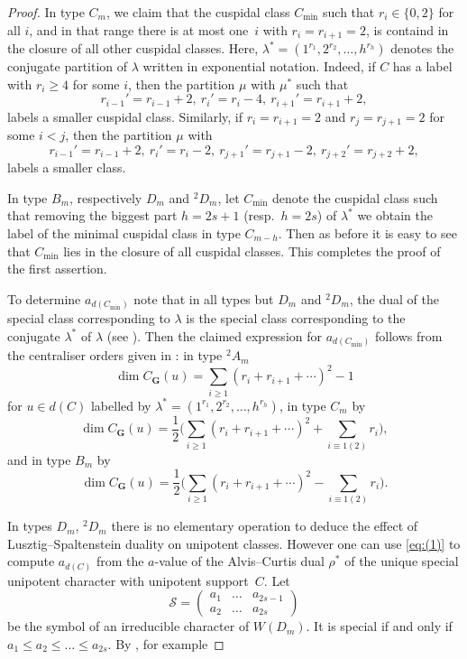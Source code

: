 \documentclass[12pt,leqno,a4paper]{amsart}
\newcommand{\bG}{{\mathbf{G}}}
\newcommand{\cS}{{\mathcal{S}}}
\newcommand{\mi}{{\operatorname{min}}}
\newcommand{\tw}[1]{{}^{#1}\!}
\let\la=\lambda
\theoremstyle{remark}
\begin{document}
\begin{proof}
In type $C_m$, we claim that the cuspidal class $C_\mi$ such that
$r_i\in\{0,2\}$ for all $i$, and in that range there is at most one~$i$ with
$r_i=r_{i+1}=2$, is containd in the closure of all other cuspidal classes.
Here, $\la^* = (1^{r_1},2^{r_2},\ldots,h^{r_h})$ denotes the conjugate
partition of $\la$ written in exponential notation. Indeed, if $C$ has a label
with $r_i\ge4$ for some $i$, then the partition $\mu$ with $\mu^*$ such that
$$r_{i-1}'=r_{i-1}+2,\ r_i'=r_i-4,\ r_{i+1}'=r_{i+1}+2,$$
labels a smaller cuspidal class. Similarly, if $r_i=r_{i+1}=2$ and
$r_j=r_{j+1}=2$ for some $i<j$, then the partition $\mu$ with
$$r_{i-1}'=r_{i-1}+2,\ r_i'=r_i-2,\ r_{j+1}'=r_{j+1}-2,\ r_{j+2}'=r_{j+2}+2,$$
labels a smaller class.
\par
In type $B_m$, respectively $D_m$ and $\tw2D_m$, let $C_\mi$ denote the
cuspidal class such that removing the biggest part $h=2s+1$ (resp.~$h=2s$) of
$\la^*$ we obtain the label of the minimal cuspidal class in type $C_{m-h}$.
Then as before it is easy to see that $C_\mi$ lies in the closure of all
cuspidal classes. This completes the proof of the first assertion.
\par
To determine $a_{d(C_\mi)}$ note that in all types but $D_m$ and $\tw2D_m$,
the dual of the special class corresponding to $\la$ is the special class
corresponding to the conjugate $\la^*$ of $\la$ (see
\cite[\S12.7 and \S13.4]{Ca}). Then the claimed expression for $a_{d(C_\mi)}$
follows from the centraliser orders given in \cite[\S 13.1]{Ca}: in type
$\tw2A_m$
$$\dim C_\bG(u)=\sum_{i\geq1}(r_i+r_{i+1}+\cdots)^2 - 1$$
for $u\in d(C)$ labelled by $\la^* = (1^{r_1},2^{r_2},\ldots,h^{r_h})$,
in type $C_m$ by
$$\dim C_\bG(u)=\frac{1}{2}\big(\sum_{i\geq1}(r_i+r_{i+1}+\cdots)^2
   +\sum_{i\equiv1(2)}r_i\big),$$
and in type $B_m$ by
$$\dim C_\bG(u)=\frac{1}{2}\big(\sum_{i\geq1}(r_i+r_{i+1}+\cdots)^2
   -\sum_{i\equiv1(2)}r_i\big).$$
\par
In types $D_m$, $\tw2D_m$ there is no elementary operation to deduce the
effect of Lusztig--Spaltenstein
duality on unipotent classes. However one can use \eqref{eq:(1)} to compute
$a_{d(C)}$ from the $a$-value of the Alvis--Curtis dual $\rho^*$ of the unique
special unipotent character with unipotent support~$C$. Let
$$\cS=\begin{pmatrix} a_1& \ldots& a_{2s-1}\\ a_2& \ldots& a_{2s}\end{pmatrix}$$
be the symbol of an irreducible character of $W(D_m)$. It is special if and
only if $a_1\le a_2\le\ldots\le a_{2s}$. By \cite[(5.15)]{MaU}, for example

\end{proof}
\end{document}
